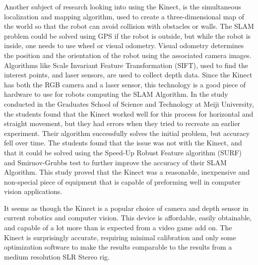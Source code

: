 \documentclass[pdftex,10.5pt]{report}
\begin{document}
Another subject of research looking into using the Kinect, is the simultaneous localization and mapping algorithm, used to create a three-dimensional map of the world so that the robot can avoid collision with obstacles or walls. The SLAM problem could be solved using GPS if the robot is outside, but while the robot is inside, one needs to use wheel or visual odometry. Visual odometry determines the position and the orientation of the robot using the associated camera images. Algorithms like Scale Invariant Feature Transformation (SIFT), used to find the interest points, and laser sensors, are used to collect depth data. Since the Kinect has both the RGB camera and a laser sensor, this technology is a good piece of hardware to use for robots computing the SLAM Algorithm. In the study conducted in the Graduates School of Science and Technology at Meiji University, the students found that the Kinect worked well for this process for horizontal and straight movement, but they had errors when they tried to recreate an earlier experiment. Their algorithm successfully solves the initial problem, but accuracy fell over time.\cite{cite2} The students found that the issue was not with the Kinect, and that it could be solved using the Speed-Up Robust Feature algorithm (SURF) and Smirnov-Grubbs test to further improve the accuracy of their SLAM Algorithm. This study proved that the Kinect was a reasonable, inexpensive and non-special piece of equipment that is capable of preforming well in computer vision applications.

It seems as though the Kinect is a popular choice of camera and depth sensor in current robotics and computer vision. This device is affordable, easily obtainable, and capable of a lot more than is expected from a video game add on. The Kinect is surprisingly accurate, requiring minimal calibration and only some optimization software to make the results comparable to the results from a medium resolution SLR Stereo rig.
\end{document}
